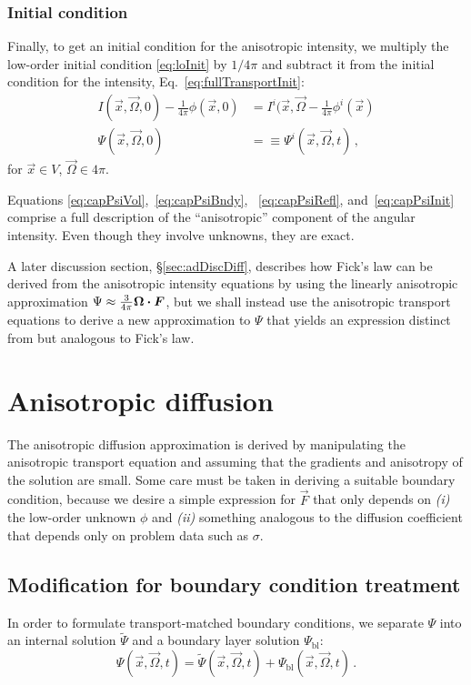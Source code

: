 \subsubsection{Initial condition}
Finally, to get an initial condition for the anisotropic intensity, we
multiply the low-order initial condition \eqref{eq:loInit} by $1/4\pi$ and
subtract it from the initial condition for the intensity,
Eq.~\eqref{eq:fullTransportInit}:
\begin{align}\nonumber
  I(\vec{x}, \vec{\Omega}, 0) - \frac{1}{4\pi}\phi(\vec{x}, 0)
 &= I^i(\vec{x}, \vec{\Omega} - \frac1{4\pi} \phi^i(\vec{x})
 \\ \label{eq:capPsiInit}
 \Psi(\vec{x}, \vec{\Omega}, 0)
 &=\equiv \Psi^i(\vec{x}, \vec{\Omega}, t)
 \,,
\end{align}
for $\vec{x} \in V$, $\vec{\Omega} \in 4\pi$.

Equations \eqref{eq:capPsiVol},~\eqref{eq:capPsiBndy},%
~\eqref{eq:capPsiRefl}, and~\eqref{eq:capPsiInit}
comprise a full description of the ``anisotropic'' component of the angular
intensity. Even though they involve unknowns, they are exact.

A later discussion section, \S\ref{sec:adDiscDiff}, describes how Fick's law can
be derived from the anisotropic intensity equations
by using the linearly anisotropic approximation \mbox{$\Psi\approx \frac{3}{4\pi}
\bm{\Omega}\bm{\cdot}\bm{F}$}, but we shall instead use the anisotropic transport
equations to
derive a new approximation to $\Psi$ that yields an expression distinct from but 
analogous to Fick's law.

\section{Anisotropic diffusion}
The anisotropic diffusion approximation is derived by manipulating the
anisotropic transport equation and assuming that the gradients and anisotropy
of the solution are small. Some care must be taken in deriving
a suitable boundary condition, because we desire a simple expression for
$\vec{F}$ that only depends on \textsl{(i)} the low-order unknown $\phi$ and
\textsl{(ii)} something analogous to the diffusion coefficient that depends only
on problem data such as $\sigma$.

\subsection{Modification for boundary condition treatment}
In order to formulate transport-matched boundary conditions, we separate $\Psi$
into an internal solution $\tilde\Psi$ and a boundary layer solution
$\Psi_\mathrm{bl}$:
\begin{equation} \label{eq:boundaryLayerPsi}
  \Psi(\vec{x}, \vec{\Omega}, t)
  = \tilde\Psi(\vec{x}, \vec{\Omega}, t)
  + \Psi_\mathrm{bl}(\vec{x}, \vec{\Omega}, t)\,.
\end{equation}

